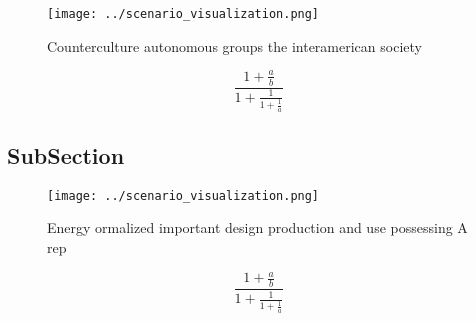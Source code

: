 \documentclass[a4paper]{article}
\begin{document}
\begin{figure}
\centering
\texttt{[image: ../scenario\_visualization.png]}
\caption{Counterculture autonomous groups the interamerican society 
}
\end{figure}
 
\[ \frac{1+\frac{a}{b}}{1+\frac{1}{1+\frac{1}{a}}} \]

\subsection{SubSection}

\begin{figure}
\centering
\texttt{[image: ../scenario\_visualization.png]}
\caption{Energy ormalized important design production and use possessing A rep
}
\end{figure}
 
\[ \frac{1+\frac{a}{b}}{1+\frac{1}{1+\frac{1}{a}}} \]
\end{document}
